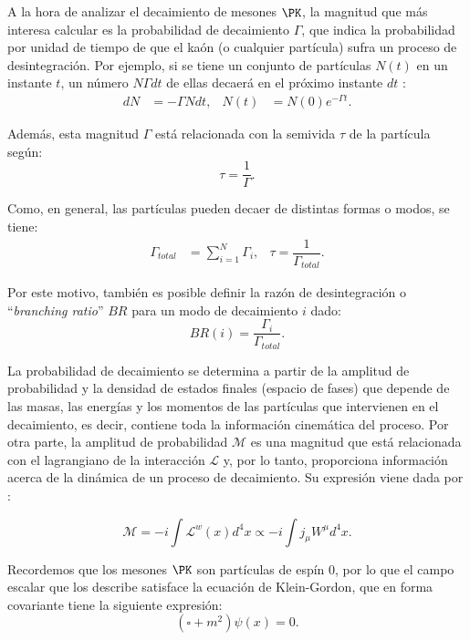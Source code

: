 A la hora de analizar el decaimiento de mesones $\PK$, la magnitud que más interesa calcular es la probabilidad de decaimiento $\Gamma$, que indica la probabilidad por unidad de tiempo de que el kaón (o cualquier partícula) sufra un proceso de desintegración. Por ejemplo, si se tiene un conjunto de partículas $N(t)$ en un instante $t$, un número $N\Gamma dt$ de ellas decaerá en el próximo instante $dt$ \cite{Griffiths2008}:
\begin{align}
dN &= -\Gamma Ndt , & N(t) &= N(0)e^{-\Gamma t} .
\end{align}

Además, esta magnitud $\Gamma$ está relacionada con la semivida $\tau$ de la partícula según:
\begin{equation}
\tau=\dfrac{1}{\Gamma} .\label{eq:meanlife}
\end{equation}

Como, en general, las partículas pueden decaer de distintas formas o modos, se tiene:
\begin{align}
\Gamma_{total} &= \sum_{i=1}^N \Gamma_i , & \tau=\dfrac{1}{\Gamma_{total}}.
\end{align}

Por este motivo, también es posible definir la razón de desintegración o ``\textit{branching ratio}'' $BR$ para un modo de decaimiento $i$ dado:
\begin{equation}
BR(i)=\dfrac{\Gamma_{i}}{\Gamma_{total}} .
\end{equation}

La probabilidad de decaimiento se determina a partir de la amplitud de probabilidad y la densidad de estados finales (espacio de fases) que depende de las masas, las energías y los momentos de las partículas que intervienen en el decaimiento, es decir, contiene toda la información cinemática del proceso. Por otra parte, la amplitud de probabilidad $\mathcal{M}$ es una magnitud que está relacionada con el lagrangiano de la interacción $\mathcal{L}$ y, por lo tanto, proporciona información acerca de la dinámica de un proceso de decaimiento. Su expresión viene dada por \cite{Halzen}:

\begin{equation}
\mathcal{M}=-i \int {\mathcal{L}}^w \left(x\right) d^{4}x \propto -i\int j_{\mu }W^{\mu }d^{4}x .\label{eq:defM}
\end{equation}

Recordemos que los mesones $\PK$ son partículas de espín 0, por lo que el campo escalar que los describe satisface la ecuación de Klein-Gordon, que en forma covariante tiene la siguiente expresión:
\begin{equation}
\left( \square +m^{2}\right) \psi \left( x\right) =0 .
\end{equation}

